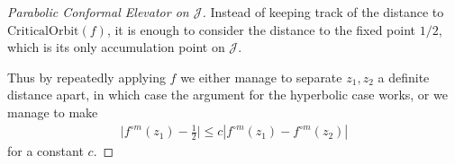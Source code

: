 \begin{proof}[Parabolic Conformal Elevator on $\mathcal J$]
Instead of keeping track of the distance to $\mathrm{CriticalOrbit}(f)$, it is enough to consider the distance to the fixed point $1/2$, which is its only accumulation point on $\mathcal J$.

Thus by repeatedly applying $f$ we either manage to separate $z_1,z_2$ a definite distance apart, in which case the argument for the hyperbolic case works, or we manage to make
\begin{align*}
\big|f^{\circ m} (z_1)-\tfrac 12\big| \leq c |f^{\circ m} (z_1)-f^{\circ m} (z_2)|
\end{align*}
for a constant $c$.
\end{proof}



\begin{comment}
\subsubsection*{Diameter Comparisons}

Denote by $\diam\left(A\right)$ the Euclidean diameter of a set $A$,
and by $i.\diam\left(A\right)$ the inner diameter on the escaping
set, i.e.\ the diameter induced by the Riemann mapping from the escaping
set to the disk.

\textbf{Claim. }$\diam T_{p,n}\asymp i.\diam T_{p,n}$.

\textbf{Claim. }$\diam U_{p,n}\asymp i.\diam U_{p,n}$.

\textbf{Observation. }Let $R>0$ be the distance from the post-critical
set to the Julia set. Consider the ball $B=B(z,\frac{R}{2})$.

Since $B$ is disjoint from the post-critical set, none of its preimages
$f^{-n}\left(B\right)$ contains the critical point $0$.

Thus $f$ restricted on each such preimage is univalent and 2-to-1.

By Koebe's distortion Theorem, applied to iterates $f^{\circ n}$,
the diameter of the preimages of $B$ changes by at most a multiplicative
constant.

This principle shows that all points $z$ on the Julia set $J(p_{c})$
are accessible, since after repeated applications of $f^{n}(B)$ we
get a topological ball of definite size which we may use to construct
an explicit path exiting $K$ in a rectifiable way.

\section{Accessibility in the Parabolic Case}


\end{comment}
